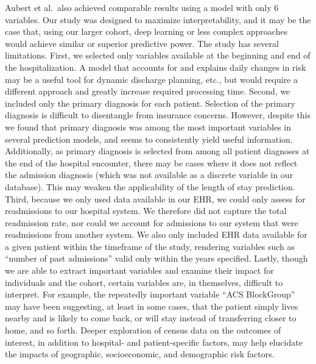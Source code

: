 Aubert et al.\ also achieved comparable results using a model with only 6 variables.\supercite{Aubert2017}
Our study was designed to maximize interpretability, and it may be the case that, using our larger cohort,
deep learning or less complex approaches would achieve similar or superior predictive power.\supercite{unreasonable2017}
The study has several limitations.
First, we selected only variables available at the beginning and end of the hospitalization.\@
A model that accounts for and explains daily changes in risk may be a useful tool for dynamic discharge planning, etc.,
but would require a different approach and greatly increase required processing time.\@ 
Second, we included only the primary diagnosis for each patient. 
Selection of the primary diagnosis is difficult to disentangle from insurance concerns.
However, despite this we found that primary diagnosis was among the most important variables in 
several prediction models, and seems to consistently yield useful information. 
Additionally, as primary diagnosis is selected from among all patient diagnoses
at the end of the hospital encounter, there may be cases where it does not 
reflect the admission diagnosis (which was not available as a discrete variable in our database).\@ 
This may weaken the applicability of the length of stay prediction.\@
Third, because we only used data available in our EHR, 
we could only assess for readmissions to our hospital system.\@
We therefore did not capture the total readmission rate,
nor could we account for admissions to our system that were readmissions
from another system.\@ 
We also only included EHR data available for a given patient within the timeframe of the study,
rendering variables such as ``number of past admissions'' valid only within the years specified.\@
Lastly, though we are able to extract important variables and examine their impact for individuals and the cohort,
certain variables are, in themselves, difficult to interpret.\@
For example, the repeatedly important variable ``ACS BlockGroup'' may have been suggesting, at least in some cases,
that the patient simply lives nearby and is likely to come back, or will stay instead of transferring closer to home, and so forth.\@
Deeper exploration of census data on the outcomes of interest, 
in addition to hospital- and patient-specific factors, may help elucidate the impacts of 
geographic, socioeconomic, and demographic risk factors.\supercite{krumholz2017}
